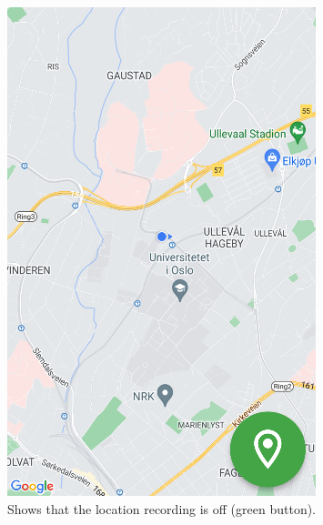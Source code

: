 \documentclass{article}
\begin{document}
\begin{figure}[H]
    \centering
    \begin{minipage}[c]{0.34\linewidth}
        \includegraphics[width=\linewidth]{graphics/recording_off.png}
        \caption{Shows that the location recording is off (green button).}
        \label{fig:recording_off}
    \end{minipage}
    \hfill
    \begin{minipage}[c]{0.34\linewidth}

\end{minipage}
\end{figure}
\end{document}
